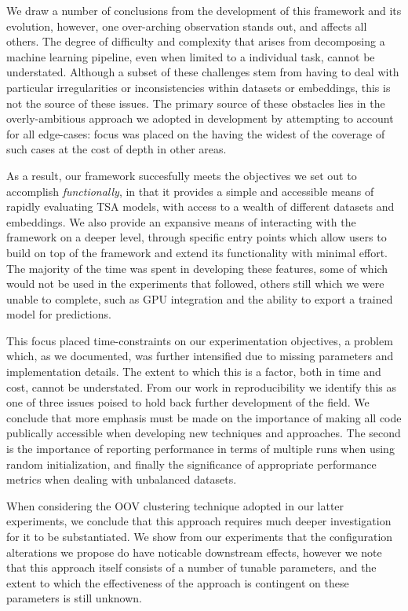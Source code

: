 \documentclass[../../fyp.tex]{subfiles}
\begin{document}
We draw a number of conclusions from the development of this framework and its evolution, however, one over-arching observation stands out, and affects all others. The degree of difficulty and complexity that arises from decomposing a machine learning pipeline, even when limited to a individual task, cannot be understated. Although a subset of these challenges stem from having to deal with particular irregularities or inconsistencies within datasets or embeddings, this is not the source of these issues. The primary source of these obstacles lies in the overly-ambitious approach we adopted in development by attempting to account for all edge-cases: focus was placed on the having the widest of the coverage of such cases at the cost of depth in other areas. 

As a result, our framework succesfully meets the objectives we set out to accomplish \textit{functionally}, in that it provides a simple and accessible means of rapidly evaluating TSA models, with access to a wealth of different datasets and embeddings. We also provide an expansive means of interacting with the framework on a deeper level, through specific entry points which allow users to build on top of the framework and extend its functionality with minimal effort. The majority of the time was spent in developing these features, some of which would not be used in the experiments that followed, others still which we were unable to complete, such as GPU integration and the ability to export a trained model for predictions. 

This focus placed time-constraints on our experimentation objectives, a problem which, as we documented, was further intensified due to missing parameters and implementation details. The extent to which this is a factor, both in time and cost, cannot be understated. From our work in reproducibility we identify this as one of three issues poised to hold back further development of the field. We conclude that more emphasis must be made on the importance of making all code publically accessible when developing new techniques and approaches. The second is the importance of reporting performance in terms of multiple runs when using random initialization, and finally the significance of appropriate performance metrics when dealing with unbalanced datasets. 

When considering the OOV clustering technique adopted in our latter experiments, we conclude that this approach requires much deeper investigation for it to be substantiated. We show from our experiments that the configuration alterations we propose do have noticable downstream effects, however we note that this approach itself consists of a number of tunable parameters, and the extent to which the effectiveness of the approach is contingent on these parameters is still unknown. 
\end{document}
